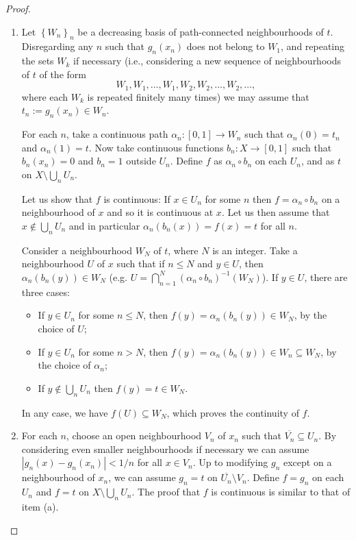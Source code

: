 \begin{proof}
\begin{enumerate}
\item[(a)] Let $\left\{W_n\right\}_n$ be a decreasing basis of path-connected neighbourhoods of $t$. Disregarding any $n$ such that $g_n(x_n)$ does not belong to $W_1$, and repeating the sets $W_k$ if necessary (i.e., considering a new sequence of neighbourhoods of $t$ of the form
\[W_1,W_1,\ldots,W_1,W_2,W_2,\ldots,W_2,\ldots,\]
where each $W_k$ is repeated finitely many times) we may assume that $t_n:=g_n(x_n)\in W_n$.

For each $n$, take a continuous path $\alpha_n:[0,1]\to W_n$ such that $\alpha_n(0)=t_n$ and $\alpha_n(1)=t$. Now take continuous functions $b_n:X\to[0,1]$ such that $b_n(x_n)=0$ and $b_n=1$ outside $U_n$. Define $f$ as $\alpha_n\circ b_n$ on each $U_n$, and as $t$ on $X\setminus\bigcup_n U_n$.

Let us show that $f$ is continuous: If $x\in U_n$ for some $n$ then $f=\alpha_n\circ b_n$ on a neighbourhood of $x$ and so it is continuous at $x$. Let us then assume that $x\not\in\bigcup_n U_n$ and in particular $\alpha_n(b_n(x))=f(x)=t$ for all $n$.

Consider a neighbourhood $W_N$ of $t$, where $N$ is an integer. Take a neighbourhood $U$ of $x$ such that if $n\leq N$ and $y\in U$, then $\alpha_n(b_n(y))\in W_N$ (e.g. $U=\bigcap_{n=1}^N(\alpha_n\circ b_n)^{-1}(W_N)$). If $y\in U$, there are three cases:
\begin{itemize}
\item If $y\in U_n$ for some $n\leq N$, then $f(y)=\alpha_n(b_n(y))\in W_N$, by the choice of $U$;
\item If $y\in U_n$ for some $n>N$, then $f(y)=\alpha_n(b_n(y))\in W_n\subseteq W_N$, by the choice of $\alpha_n$;
\item If $y\not\in\bigcup_n U_n$ then $f(y)=t\in W_N$.
\end{itemize}
In any case, we have $f(U)\subseteq W_N$, which proves the continuity of $f$.
\item[(b)] For each $n$, choose an open neighbourhood $V_n$ of $x_n$ such that $\overline{V_n}\subseteq U_n$. By considering even smaller neighbourhoods if necessary we can assume $|g_n(x)-g_n(x_n)|<1/n$ for all $x\in V_n$. Up to modifying $g_n$ except on a neighbourhood of $x_n$, we can assume $g_n=t$ on $\overline{U_n}\setminus V_n$. Define $f=g_n$ on each $U_n$ and $f=t$  on $X\setminus\bigcup_n U_n$. The proof that $f$ is continuous is similar to that of item (a).\qedhere
\end{enumerate}
\end{proof}

